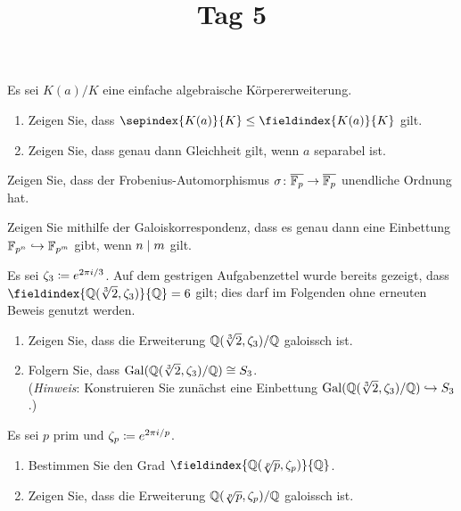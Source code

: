 \documentclass[a4paper, 10pt]{scrartcl}
\title{Tag 5}
\author{}
\date{}
\begin{document}
\begin{question}
  Es sei $K(a)/K$ eine einfache algebraische Körpererweiterung.
  \begin{enumerate}
    \item
      Zeigen Sie, dass $\sepindex{K(a)}{K} \leq \fieldindex{K(a)}{K}$ gilt.
    \item
      Zeigen Sie, dass genau dann Gleichheit gilt, wenn $a$ separabel ist.
  \end{enumerate}
\end{question}

\begin{question}
  Zeigen Sie, dass der Frobenius-Automorphismus $\sigma \colon \overline{\mathbb{F}_p} \to \overline{\mathbb{F}_p}$ unendliche Ordnung hat.
\end{question}

\begin{question}
  Zeigen Sie mithilfe der Galoiskorrespondenz, dass es genau dann eine Einbettung $\mathbb{F}_{p^n} \hookrightarrow \mathbb{F}_{p^m}$ gibt, wenn $n \mathrel{|} m$ gilt.
\end{question}

\begin{question}
  Es sei $\zeta_3 \coloneqq e^{2 \pi i /3}$.
  Auf dem gestrigen Aufgabenzettel wurde bereits gezeigt, dass $\fieldindex{\Rational(\sqrt[3]{2}, \zeta_3)}{\Rational} = 6$ gilt;
  dies darf im Folgenden ohne erneuten Beweis genutzt werden.
  \begin{enumerate}
    \item
      Zeigen Sie, dass die Erweiterung $\mathbb{Q}(\sqrt[3]{2}, \zeta_3)/\mathbb{Q}$ galoissch ist.
    \item
      Folgern Sie, dass $\operatorname{Gal}(\mathbb{Q}(\sqrt[3]{2}, \zeta_3)/\mathbb{Q}) \cong S_3$.
      \\
      (\emph{Hinweis}:
       Konstruieren Sie zunächst eine Einbettung $\operatorname{Gal}(\mathbb{Q}(\sqrt[3]{2}, \zeta_3)/\mathbb{Q}) \hookrightarrow S_3$.)
  \end{enumerate}
\end{question}

\begin{question}
  Es sei $p$ prim und $\zeta_p \coloneqq e^{2 \pi i / p}$.
  \begin{enumerate}
    \item
      Bestimmen Sie den Grad $\fieldindex{\Rational(\sqrt[p]{p}, \zeta_p)}{\Rational}$.
    \item
      Zeigen Sie, dass die Erweiterung $\mathbb{Q}(\sqrt[p]{p}, \zeta_p)/\mathbb{Q}$ galoissch ist.
  \end{enumerate}
\end{question}
\end{document}
